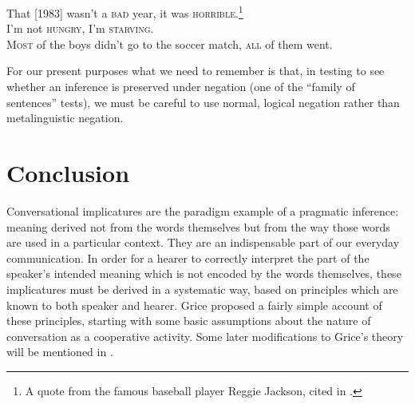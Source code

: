 \ea \label{ex:8.29}
\ea That [1983] wasn’t a \textsc{bad} year, it was \textsc{horrible}.\footnote{A quote from the famous baseball player Reggie Jackson, cited in \citet[382]{Horn1989}.}\\
\ex I’m not \textsc{hungry}, I’m \textsc{starving}.\\
\ex \textsc{Most} of the boys didn’t go to the soccer match, \textsc{all} of them went.
                       \z
\z


For our present purposes what we need to remember is that, in testing to see whether an inference is preserved under negation (one of the “family of sentences” tests), we must be careful to use normal, logical negation rather than metalinguistic negation.


\section{Conclusion}\label{sec:8.7}

Conversational implicatures are the paradigm example of a pragmatic inference: meaning derived not from the words themselves but from the way those words are used in a particular context. They are an indispensable part of our everyday communication. In order for a hearer to correctly interpret the part of the speaker’s intended meaning which is not encoded by the words themselves, these implicatures must be derived in a systematic way, based on principles which are known to both speaker and hearer. Grice proposed a fairly simple account of these principles, starting with some basic assumptions about the nature of conversation as a cooperative activity. Some later modifications to Grice’s theory will be mentioned in .




